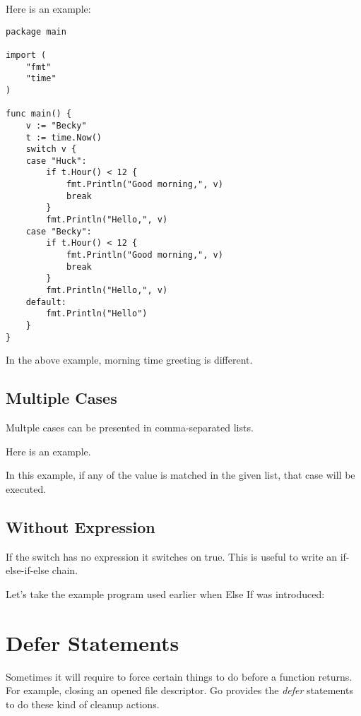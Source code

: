 Here is an example:

\begin{lstlisting}[caption=Switch case with break]
package main

import (
    "fmt"
    "time"
)

func main() {
    v := "Becky"
    t := time.Now()
    switch v {
    case "Huck":
        if t.Hour() < 12 {
            fmt.Println("Good morning,", v)
            break
        }
        fmt.Println("Hello,", v)
    case "Becky":
        if t.Hour() < 12 {
            fmt.Println("Good morning,", v)
            break
        }
        fmt.Println("Hello,", v)
    default:
        fmt.Println("Hello")
    }
}
\end{lstlisting}

In the above example, morning time greeting is different.

\subsection{Multiple Cases}

Multple cases can be presented in
comma-separated lists.

Here is an example.



In this example, if any of the value is matched in the given list,
that case will be executed.

\subsection{Without Expression}

If the switch has no expression it
switches on true.  This is useful to write an if-else-if-else chain.

Let's take the example program used earlier when Else If was
introduced:



\section{Defer Statements}

Sometimes it will require to force certain things to do before a
function returns.  For example, closing an opened file descriptor.  Go
provides the \textit{defer} statements to do these kind
of cleanup actions.

